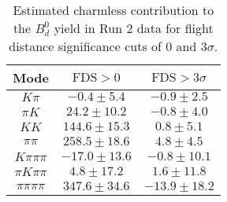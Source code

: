 \begin{table}[h]
  \centering
  \begin{tabular}{ccc}
      \toprule
      Mode & $\mathrm{FDS} > 0$ & $\mathrm{FDS} > 3\sigma$ \\
      \midrule
      $K\pi$ & $-0.4 \pm 5.4$ & $-0.9 \pm 2.5$ \\
      $\pi K$ & $24.2 \pm 10.2$ & $-0.8 \pm 4.0$ \\
      $KK$ & $144.6 \pm 15.3$ & $0.8 \pm 5.1$ \\
      $\pi\pi$ & $258.5 \pm 18.6$ & $4.8 \pm 4.5$ \\
      $K\pi\pi\pi$ & $-17.0 \pm 13.6$ & $-0.8 \pm 10.1$ \\
      $\pi K\pi\pi$ & $4.8 \pm 17.2$ & $1.6 \pm 11.8$ \\
      $\pi\pi\pi\pi$ & $347.6 \pm 34.6$ & $-13.9 \pm 18.2$ \\
      \bottomrule
  \end{tabular}
  \caption{\small Estimated charmless contribution to the $B^{0}_{d}$ yield in Run 2 data for flight distance significance cuts of 0  and $3\sigma$.}
\label{tab:charmless_yields_Bd_run_2}
\end{table}

